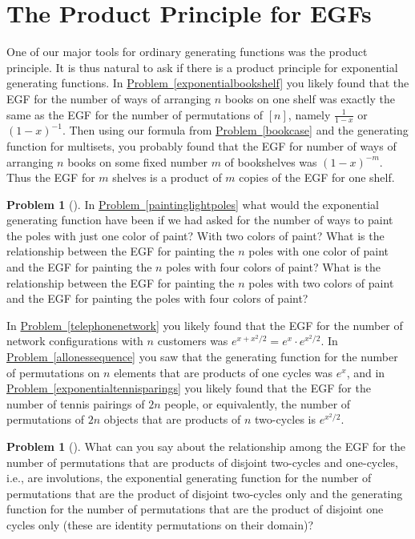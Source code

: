 \documentclass[10pt,]{book}
\theoremstyle{plain}
\theoremstyle{definition}
\newtheorem{activity}[project]{Problem}
\theoremstyle{definition}
\numberwithin{equation}{chapter}
\begin{document}
\section[{The Product Principle for EGFs}]{The Product Principle for EGFs}\label{app3-4-prodprinc}
\hypertarget{p-2098}{}%
One of our major tools for ordinary generating functions was the product principle. It is thus natural to ask if there is a product principle for exponential generating functions. In \hyperref[exponentialbookshelf]{Problem~\ref{exponentialbookshelf}} you likely found that the EGF for the number of ways of arranging \(n\) books on one shelf was exactly the same as the EGF for the number of permutations of \([n]\), namely \(\frac{1}{1-x}\) or \((1-x)^{-1}\). Then using our formula from \hyperref[bookcase]{Problem~\ref{bookcase}} and the generating function for multisets, you probably found that the EGF for number of ways of arranging \(n\) books on some fixed number \(m\) of bookshelves was \((1-x)^{-m}\). Thus the EGF for \(m\) shelves is a product of \(m\) copies of the EGF for one shelf.%
\begin{activity}[] \label{paintinglightpoles2}
\hypertarget{p-2099}{}%
In \hyperref[paintinglightpoles]{Problem~\ref{paintinglightpoles}} what would the exponential generating function have been if we had asked for the number of ways to paint the poles with just one color of paint? With two colors of paint? What is the relationship between the EGF for painting the \(n\) poles with one color of paint and the EGF for painting the \(n\) poles with four colors of paint? What is the relationship between the EGF for painting the \(n\) poles with two colors of paint and the EGF for painting the poles with four colors of paint?%
\end{activity}
\hypertarget{p-2101}{}%
In \hyperref[telephonenetwork]{Problem~\ref{telephonenetwork}} you likely found that the EGF for the number of network configurations with \(n\) customers was \(e^{x+x^2/2}= e^x \cdot
e^{x^2/2}\). In \hyperref[allonessequence]{Problem~\ref{allonessequence}} you saw that the generating function for the number of permutations on \(n\) elements that are products of one cycles was \(e^x\), and in \hyperref[exponentialtennisparings]{Problem~\ref{exponentialtennisparings}} you likely found that the EGF for the number of tennis pairings of \(2n\) people, or equivalently, the number of permutations of \(2n\) objects that are products of \(n\) two-cycles is \(e^{x^2/2}\).%
\begin{activity}[] \label{x2cyclesand1cycles}
\hypertarget{p-2102}{}%
What can you say about the relationship among the EGF for the number of permutations that are products of disjoint two-cycles and one-cycles, i.e., are involutions, the exponential generating function for the number of permutations that are the product of disjoint two-cycles only and the generating function for the number of permutations that are the product of disjoint one cycles only (these are identity permutations on their domain)?%
\end{activity}
\end{document}
